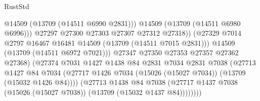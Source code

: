 \begin{lexlean}{RustStd}
\begin{coremodule}
                                                @14509
                                                (@13709 (@14511 @6990 @2831)))
                                              @14509
                                              (@13709 (@14511 @6980 @6996)))
                                            @27297
                                            @27300
                                            @27303
                                            @27307
                                            @27312
                                            @27318))
                                        (@27329
                                          @7014
                                          @2797
                                          @16467
                                          @16481
                                          @14509
                                          (@13709 (@14511 @7015 @2831)))
                                        @14509
                                        (@13709 (@14511 @6972 @7021)))
                                      @27347
                                      @27350
                                      @27353
                                      @27357
                                      @27362
                                      @27368)
                                    (@27374
                                      @7031
                                      @1427
                                      @1438
                                      @84
                                      @2831
                                      @7034
                                      @2831
                                      @7038
                                      (@27713
                                        @1427
                                        @84
                                        @7034
                                        (@27717
                                          @1426
                                          @7034
                                          (@15026 (@15027 @7034))
                                          (@13709 (@15032 @1426 @84))))
                                      (@27713
                                        @1438
                                        @84
                                        @7038
                                        (@27717
                                          @1437
                                          @7038
                                          (@15026 (@15027 @7038))
                                          (@13709 (@15032 @1437 @84))))))))

\end{coremodule}
\end{lexlean}
